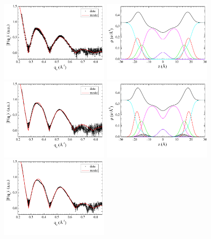 \begin{figure}[htbp]
  \centering
  \includegraphics[trim=5 30 0 0,clip=true,width=0.47\textwidth]{figures/Tat/SDP_Results/XFF/DOPCDOPE3to1_XFF1}
  \includegraphics[trim=5 30 0 0,clip=true,width=0.47\textwidth]{figures/Tat/SDP_Results/EDP/DOPCDOPE3to1_EDP1}
  \includegraphics[trim=5 30 0 0,clip=true,width=0.47\textwidth]{figures/Tat/SDP_Results/XFF/DOPCDOPE3to1_Tat_62to1_3p0_XFF1}
  \includegraphics[trim=5 30 0 0,clip=true,width=0.47\textwidth]{figures/Tat/SDP_Results/EDP/DOPCDOPE3to1_Tat_62to1_3p0_EDP1}
  \includegraphics[trim=5 30 0 0,clip=true,width=0.47\textwidth]{figures/Tat/SDP_Results/XFF/DOPCDOPE3to1_Tat_28to1_3p0_XFF1}

\end{figure}
